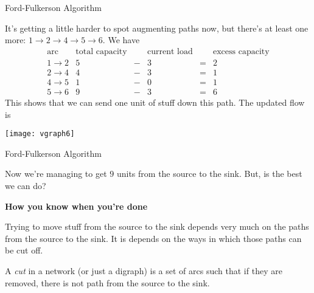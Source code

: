 \begin{frame}[fragile]{Ford-Fulkerson Algorithm}

It's getting a little harder to spot augmenting paths now, but there's at least one more: $1\rightarrow 2\rightarrow 4\rightarrow 5\rightarrow 6$.  We have
$$
\begin{array}{r|ccccc}
\mbox{arc}&\mbox{total capacity}&&\mbox{current load}&&\mbox{excess capacity}\\
\hline
1\rightarrow 2&5&-&3&=&2\\
2\rightarrow 4&4&-&3&=&1\\
4\rightarrow 5&1&-&0&=&1\\
5\rightarrow 6&9&-&3&=&6
\end{array}
$$
This shows that we can send one unit of stuff down this path.  The updated flow is
\begin{center}
\texttt{[image: vgraph6]}
\end{center}

\end{frame}
\begin{frame}[fragile]{Ford-Fulkerson Algorithm}


Now we're managing to get $9$ units from the source to the sink.  But, is the best we can do?

\bigskip
{\bf How you know when you're done}
\bigskip

Trying to move stuff from the source to the sink depends very much on the paths from the source to the sink.  It is depends on the ways in which those paths can be cut off.

\begin{definition}
A {\it cut\/} in a network (or just a digraph) is a set of arcs such that if they are removed, there is not path from the source to the sink.
\end{definition}

\end{frame}
